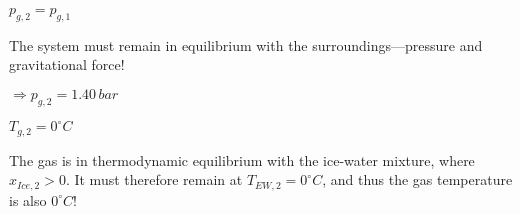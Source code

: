 \( p_{g,2} = p_{g,1} \)  

The system must remain in equilibrium with the surroundings—pressure and gravitational force!  

\( \Rightarrow p_{g,2} = 1.40 \, bar \)  

\( T_{g,2} = 0^\circ C \)  

The gas is in thermodynamic equilibrium with the ice-water mixture, where \( x_{Ice,2} > 0 \). It must therefore remain at \( T_{EW,2} = 0^\circ C \), and thus the gas temperature is also \( 0^\circ C \)!